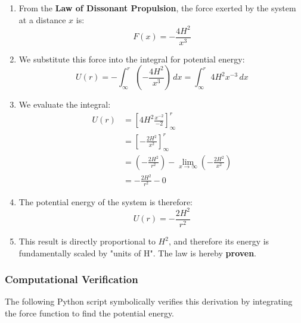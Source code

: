 \begin{enumerate}
    \item From the \textbf{Law of Dissonant Propulsion}, the force exerted by the system at a distance $x$ is:
    $$ F(x) = -\frac{4H^2}{x^3} $$
    
    \item We substitute this force into the integral for potential energy:
    $$ U(r) = -\int_{\infty}^{r} \left(-\frac{4H^2}{x^3}\right) \,dx = \int_{\infty}^{r} 4H^2x^{-3} \,dx $$
    
    \item We evaluate the integral:
    \begin{align*}
        U(r) &= \left[ 4H^2 \frac{x^{-2}}{-2} \right]_{\infty}^{r} \\
        &= \left[ -\frac{2H^2}{x^2} \right]_{\infty}^{r} \\
        &= \left(-\frac{2H^2}{r^2}\right) - \lim_{x\to\infty}\left(-\frac{2H^2}{x^2}\right) \\
        &= -\frac{2H^2}{r^2} - 0
    \end{align*}
    
    \item The potential energy of the system is therefore:
    $$ U(r) = -\frac{2H^2}{r^2} $$
    
    \item This result is directly proportional to $H^2$, and therefore its energy is fundamentally scaled by "units of H". The law is hereby \textbf{proven}.
\end{enumerate}

\subsubsection*{Computational Verification}
The following Python script symbolically verifies this derivation by integrating the force function to find the potential energy.

